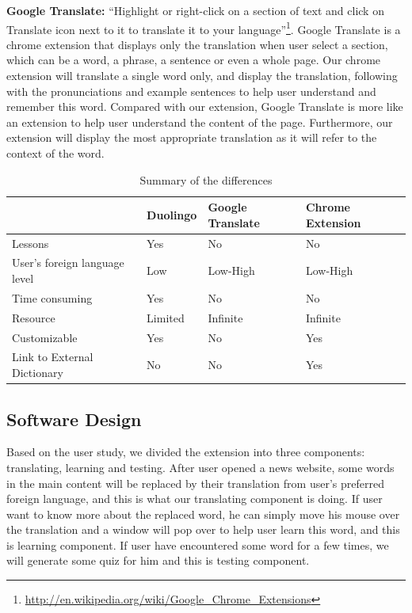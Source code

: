 \textbf{Google Translate:} ``Highlight or right-click on a section of text and click
on Translate icon next to it to translate it to your 
language''\footnote{\url{http://en.wikipedia.org/wiki/Google_Chrome_Extensions}}. 
Google Translate is a chrome extension that displays only the translation when user 
select a section, which can be a word, a phrase, a sentence or even a whole page. 
Our chrome extension will translate a single word only, and display the translation,
following with the pronunciations and example sentences to help user understand and 
remember this word. Compared with our extension, Google Translate is more like an extension 
to help user understand the content of the page. Furthermore, our extension will display 
the most appropriate translation as it will refer to the context of the word.
\begin{table}[ht]
  \caption{Summary of the differences}
  \label{table:difference_summary}
  \begin{center}
  \begin{tabular}{| p{2.4cm} | p{1.2cm} | p{1.2cm} |  p{1.2cm} |}
    \hline
    & Duolingo & Google Translate & Chrome Extension \\
    \hline
    Lessons & Yes & No & No \\
    \hline
    User's foreign language level & Low & Low-High & Low-High \\
    \hline
    Time consuming & Yes & No & No\\
    \hline
    Resource & Limited & Infinite & Infinite \\
    \hline
    Customizable & Yes & No & Yes \\
    \hline
    Link to External Dictionary & No & No & Yes \\
    \hline
  \end{tabular}
  \end{center}
\end{table}
\subsection{Software Design}
Based on the user study, we divided the extension into three components: translating, learning and testing. After user opened a news website, 
some words in the main content will be replaced by their translation from user's preferred foreign language, and this is what our translating 
component is doing. If user want to know more about the replaced word, he can simply move his mouse over the translation and a window will pop 
over to help user learn this word, and this is learning component. If user have encountered some word for a few times, we will generate some 
quiz for him and this is testing component.

